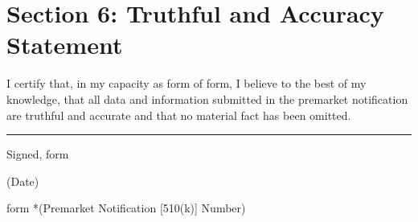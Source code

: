 \documentclass{article}
\begin{document}
\section*{Section 6: Truthful and Accuracy Statement}

I certify that, in my capacity as {{form}} of {{form}}, I believe to the best of my knowledge, that all data and information submitted in the premarket notification are truthful and accurate and that no material fact has been omitted. \hfill \break

\hrule
\hfill \break

Signed,
{{form}}

\hfill \break
(Date)

{{form}}
*(Premarket Notification [510(k)] Number)
\end{document}
